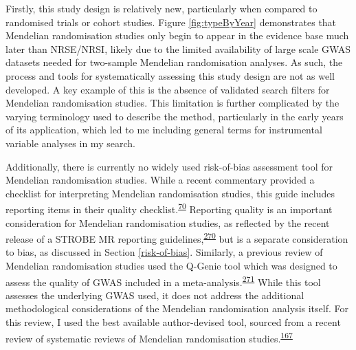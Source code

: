 \documentclass[a4paper, twoside]{templates/ociamthesis}
\begin{document}
Firstly, this study design is relatively new, particularly when compared to randomised trials or cohort studies. Figure \ref{fig:typeByYear} demonstrates that Mendelian randomisation studies only begin to appear in the evidence base much later than NRSE/NRSI, likely due to the limited availability of large scale GWAS datasets needed for two-sample Mendelian randomisation analyses. As such, the process and tools for systematically assessing this study design are not as well developed. A key example of this is the absence of validated search filters for Mendelian randomisation studies. This limitation is further complicated by the varying terminology used to describe the method, particularly in the early years of its application, which led to me including general terms for instrumental variable analyses in my search.

Additionally, there is currently no widely used risk-of-bias assessment tool for Mendelian randomisation studies. While a recent commentary provided a checklist for interpreting Mendelian randomisation studies, this guide includes reporting items in their quality checklist.\textsuperscript{\protect\hyperlink{ref-davies2018}{70}} Reporting quality is an important consideration for Mendelian randomisation studies, as reflected by the recent release of a STROBE MR reporting guidelines,\textsuperscript{\protect\hyperlink{ref-skrivankova2021}{270}} but is a separate consideration to bias, as discussed in Section \ref{risk-of-bias}. Similarly, a previous review of Mendelian randomisation studies used the Q-Genie tool which was designed to assess the quality of GWAS included in a meta-analysis.\textsuperscript{\protect\hyperlink{ref-sohani2015}{271}} While this tool assesses the underlying GWAS used, it does not address the additional methodological considerations of the Mendelian randomisation analysis itself. For this review, I used the best available author-devised tool, sourced from a recent review of systematic reviews of Mendelian randomisation studies.\textsuperscript{\protect\hyperlink{ref-spiga2021}{167}}
\end{document}
